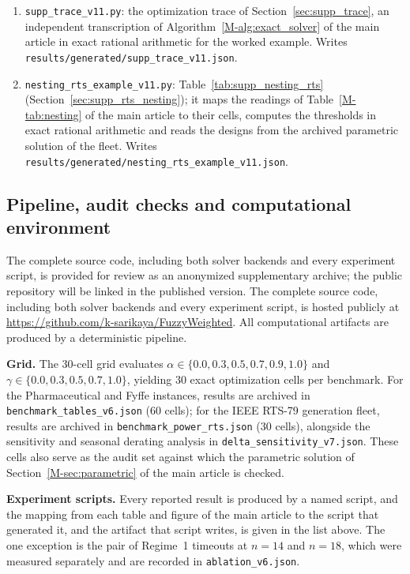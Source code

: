 \documentclass[11pt]{article}
\begin{document}
\begin{enumerate}
\item \texttt{supp\_trace\_v11.py}: the optimization trace of Section~\ref{sec:supp_trace}, an independent transcription of Algorithm~\ref*{M-alg:exact_solver} of the main article in exact rational arithmetic for the worked example. Writes \texttt{results/generated/supp\_trace\_v11.json}.
\item \texttt{nesting\_rts\_example\_v11.py}: Table~\ref{tab:supp_nesting_rts} (Section~\ref{sec:supp_rts_nesting}); it maps the readings of Table~\ref*{M-tab:nesting} of the main article to their cells, computes the thresholds in exact rational arithmetic and reads the designs from the archived parametric solution of the fleet. Writes \texttt{results/generated/nesting\_rts\_example\_v11.json}.
\end{enumerate}



\subsection{Pipeline, audit checks and computational environment}

\ifdefined\anonbuild
The complete source code, including both solver backends and every experiment script, is provided for
review as an anonymized supplementary archive; the public repository will be linked in the published version.
\else
The complete source code, including both solver backends and every experiment script, is hosted
publicly at \href{https://github.com/k-sarikaya/FuzzyWeighted}{https://github.com/k-sarikaya/FuzzyWeighted}.
\fi
All computational artifacts are produced by a deterministic pipeline.

\textbf{Grid.} The $30$-cell grid evaluates
$\alpha \in \{0.0,\allowbreak 0.3,\allowbreak 0.5,\allowbreak 0.7,\allowbreak 0.9,\allowbreak 1.0\}$ and $\gamma \in \{0.0,\allowbreak 0.3,\allowbreak 0.5,\allowbreak 0.7,\allowbreak 1.0\}$, yielding $30$ exact
optimization cells per benchmark. For the Pharmaceutical and Fyffe instances, results are archived in \texttt{benchmark\_tables\_v6.json} ($60$ cells); for the IEEE RTS-79 generation fleet, results are archived in \texttt{benchmark\_power\_rts.json} ($30$ cells), alongside the sensitivity and seasonal derating analysis in \texttt{delta\_sensitivity\_v7.json}.
These cells also serve as the audit set against which the parametric solution of
Section~\ref*{M-sec:parametric} of the main article is checked.


\textbf{Experiment scripts.} Every reported result is produced by a named script, and the
mapping from each table and figure of the main article to the script that generated it, and the
artifact that script writes, is given in the list above. The one exception is the pair of Regime~1
timeouts at $n=14$ and $n=18$, which were measured separately and are recorded in
\texttt{ablation\_v6.json}.
\end{document}

